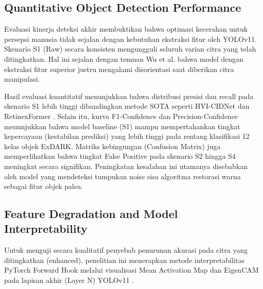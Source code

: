 \documentclass[conference]{IEEEtran}
\begin{document}

\subsection{Quantitative Object Detection Performance} Evaluasi kinerja deteksi akhir membuktikan bahwa optimasi kecerahan untuk persepsi manusia tidak sejalan dengan kebutuhan ekstraksi fitur oleh YOLOv11. Skenario S1 (Raw) secara konsisten mengungguli seluruh varian citra yang telah ditingkatkan. Hal ini sejalan dengan temuan Wu et al. \cite{wu2024llieeffect} bahwa model dengan ekstraksi fitur superior justru mengalami disorientasi saat diberikan citra manipulasi.

Hasil evaluasi kuantitatif menunjukkan bahwa distribusi presisi dan recall pada skenario S1 lebih tinggi dibandingkan metode SOTA seperti HVI-CIDNet \cite{yan2025hvi} dan RetinexFormer \cite{cai2023retinexformer}. Selain itu, kurva F1-Confidence dan Precision-Confidence menunjukkan bahwa model baseline (S1) mampu mempertahankan tingkat kepercayaan (kestabilan prediksi) yang lebih tinggi pada rentang klasifikasi 12 kelas objek ExDARK. Matriks kebingungan (Confusion Matrix) juga memperlihatkan bahwa tingkat False Positive pada skenario S2 hingga S4 meningkat secara signifikan. Peningkatan kesalahan ini utamanya disebabkan oleh model yang mendeteksi tumpukan noise sisa algoritma restorasi warna sebagai fitur objek palsu.


\subsection{Feature Degradation and Model Interpretability} Untuk menguji secara kualitatif penyebab penurunan akurasi pada citra yang ditingkatkan (enhanced), penelitian ini menerapkan metode interpretabilitas PyTorch Forward Hook melalui visualisasi Mean Activation Map dan EigenCAM pada lapisan akhir (Layer N) YOLOv11 \cite{metrics2026formulas}.
\end{document}
